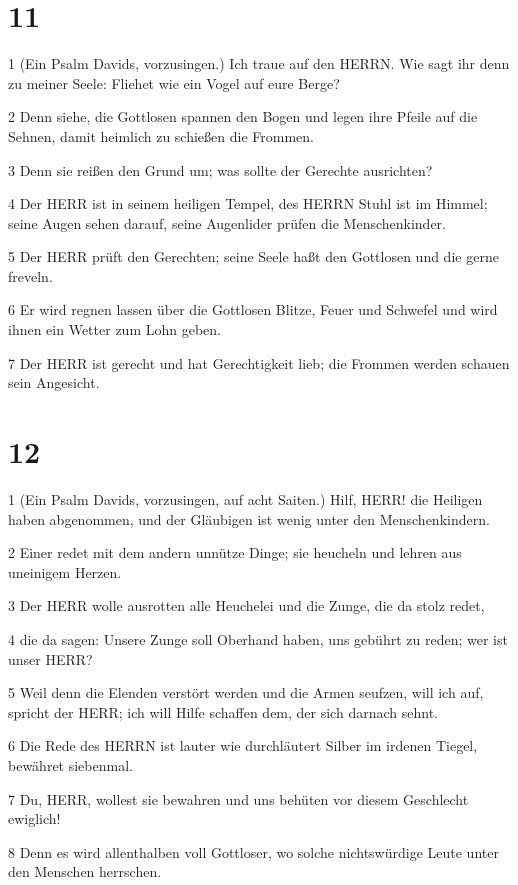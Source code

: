 \chapter{11}

\par 1 (Ein Psalm Davids, vorzusingen.) Ich traue auf den HERRN. Wie sagt ihr denn zu meiner Seele: Fliehet wie ein Vogel auf eure Berge?
\par 2 Denn siehe, die Gottlosen spannen den Bogen und legen ihre Pfeile auf die Sehnen, damit heimlich zu schießen die Frommen.
\par 3 Denn sie reißen den Grund um; was sollte der Gerechte ausrichten?
\par 4 Der HERR ist in seinem heiligen Tempel, des HERRN Stuhl ist im Himmel; seine Augen sehen darauf, seine Augenlider prüfen die Menschenkinder.
\par 5 Der HERR prüft den Gerechten; seine Seele haßt den Gottlosen und die gerne freveln.
\par 6 Er wird regnen lassen über die Gottlosen Blitze, Feuer und Schwefel und wird ihnen ein Wetter zum Lohn geben.
\par 7 Der HERR ist gerecht und hat Gerechtigkeit lieb; die Frommen werden schauen sein Angesicht.

\chapter{12}

\par 1 (Ein Psalm Davids, vorzusingen, auf acht Saiten.) Hilf, HERR! die Heiligen haben abgenommen, und der Gläubigen ist wenig unter den Menschenkindern.
\par 2 Einer redet mit dem andern unnütze Dinge; sie heucheln und lehren aus uneinigem Herzen.
\par 3 Der HERR wolle ausrotten alle Heuchelei und die Zunge, die da stolz redet,
\par 4 die da sagen: Unsere Zunge soll Oberhand haben, uns gebührt zu reden; wer ist unser HERR?
\par 5 Weil denn die Elenden verstört werden und die Armen seufzen, will ich auf, spricht der HERR; ich will Hilfe schaffen dem, der sich darnach sehnt.
\par 6 Die Rede des HERRN ist lauter wie durchläutert Silber im irdenen Tiegel, bewähret siebenmal.
\par 7 Du, HERR, wollest sie bewahren und uns behüten vor diesem Geschlecht ewiglich!
\par 8 Denn es wird allenthalben voll Gottloser, wo solche nichtswürdige Leute unter den Menschen herrschen.

